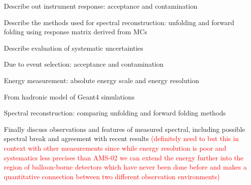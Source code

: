 \documentclass{article}
\begin{document}
\begin{myEnumerate}
		\item Describe out instrument response: acceptance and contamination
		\item Describe the methods used for spectral reconstruction: unfolding and forward folding using response matrix derived from MCs
		\item Describe evaluation of systematic uncertainties
		\begin{myEnumerate}
			\item Due to event selection: acceptance and contamination
			\item Energy measurement: absolute energy scale and energy resolution
			\item From hadronic model of Geant4 simulations
			\item Spectral reconstruction: comparing unfolding and forward folding methods
		\end{myEnumerate}
		\item Finally discuss observations and features of measured spectral, including possible spectral break and agreement with recent results \textcolor{red}{(definitely need to but this in context with other measurements since while energy resolution is poor and systematics less precises than AMS-02 we can extend the energy further into the region of balloon-borne detectors which have never been done before and makes a quantitative connection between two different observation environments)}
	\end{myEnumerate}
\end{document}
